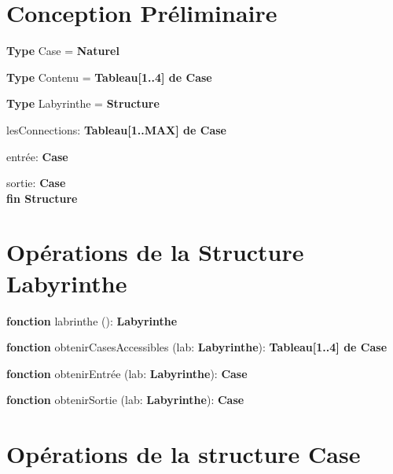 \documentclass[letterpaper,12pt]{report}
\begin{document}

\section*{Conception Préliminaire}

\noindent\textbf{Type} Case = \textbf{Naturel}

\noindent\textbf{Type} Contenu = \textbf{Tableau[1..4] de Case}

\noindent\textbf{Type} Labyrinthe = \textbf{Structure}

lesConnections: \textbf{Tableau[1..MAX] de Case}

entrée: \textbf{Case}

sortie: \textbf{Case}\\
\textbf{fin Structure}

\section*{Opérations de la Structure Labyrinthe}


\textbf{fonction} labrinthe (): \textbf{Labyrinthe}

\textbf{fonction} obtenirCasesAccessibles (lab: \textbf{Labyrinthe}): \textbf{Tableau[1..4] de Case}

\textbf{fonction} obtenirEntrée (lab: \textbf{Labyrinthe}): \textbf{Case}

\textbf{fonction} obtenirSortie (lab: \textbf{Labyrinthe}): \textbf{Case}

\section*{Opérations de la structure Case}
\end{document}

